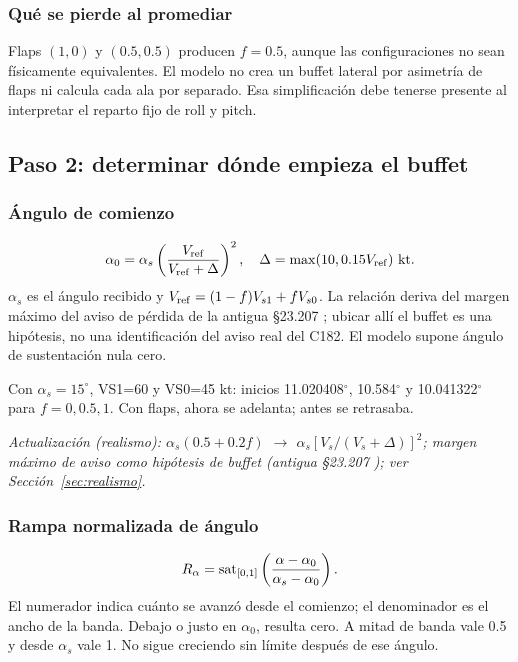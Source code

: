 \subsubsection{Qué se pierde al promediar}
Flaps $(1,0)$ y $(0.5,0.5)$ producen $f=0.5$, aunque las configuraciones no sean físicamente equivalentes. El modelo no crea un buffet lateral por asimetría de flaps ni calcula cada ala por separado. Esa simplificación debe tenerse presente al interpretar el reparto fijo de roll y pitch.

\subsection{Paso 2: determinar dónde empieza el buffet}
\subsubsection{Ángulo de comienzo}
\begin{equation}
\alpha_0=\alpha_s\left(\frac{V_{\rm ref}}{V_{\rm ref}+\Delta}\right)^2,\quad \Delta=\max(10,0.15V_{\rm ref})\ {\rm kt}.
\label{eq:stall-onset}
\end{equation}
$\alpha_s$ es el ángulo recibido y $V_{\rm ref}=(1-f)V_{s1}+fV_{s0}$. La relación deriva del margen máximo del aviso de pérdida de la antigua §23.207 \cite{cfr23}; ubicar allí el buffet es una hipótesis, no una identificación del aviso real del C182. El modelo supone ángulo de sustentación nula cero.

Con $\alpha_s=15^\circ$, VS1=60 y VS0=45 kt: inicios 11.020408$^\circ$, 10.584$^\circ$ y 10.041322$^\circ$ para $f=0,0.5,1$. Con flaps, ahora se adelanta; antes se retrasaba.

\textit{Actualización (realismo): $\alpha_s(0.5+0.2f)$ $\rightarrow$ $\alpha_s[V_s/(V_s+\Delta)]^2$; margen máximo de aviso como hipótesis de buffet (antigua §23.207 \cite{cfr23}); ver Sección~\ref{sec:realismo}.}

\subsubsection{Rampa normalizada de ángulo}
\begin{equation}
R_\alpha=\operatorname{sat}_{[0,1]}\left(\frac{\alpha-\alpha_0}{\alpha_s-\alpha_0}\right).
\label{eq:stall-ramp}
\end{equation}
El numerador indica cuánto se avanzó desde el comienzo; el denominador es el ancho de la banda. Debajo o justo en $\alpha_0$, resulta cero. A mitad de banda vale 0.5 y desde $\alpha_s$ vale 1. No sigue creciendo sin límite después de ese ángulo.

